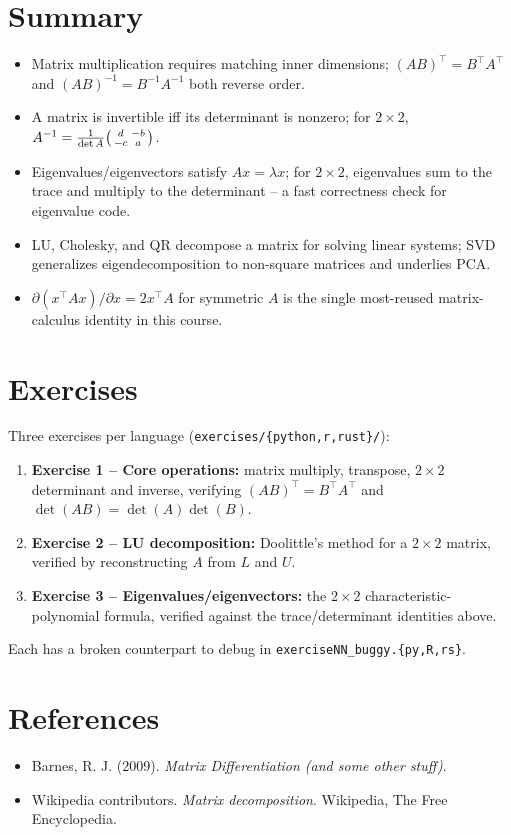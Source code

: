 \documentclass[11pt]{article}
\begin{document}
\section{Summary}
\begin{summarybox}
\begin{itemize}[nosep]
  \item Matrix multiplication requires matching inner dimensions; $(AB)^\top
        = B^\top A^\top$ and $(AB)^{-1} = B^{-1}A^{-1}$ both reverse order.
  \item A matrix is invertible iff its determinant is nonzero; for $2\times2$,
        $A^{-1} = \frac{1}{\det A}\begin{psmallmatrix}d&-b\\-c&a\end{psmallmatrix}$.
  \item Eigenvalues/eigenvectors satisfy $Ax=\lambda x$; for $2\times2$,
        eigenvalues sum to the trace and multiply to the determinant --
        a fast correctness check for eigenvalue code.
  \item LU, Cholesky, and QR decompose a matrix for solving linear systems;
        SVD generalizes eigendecomposition to non-square matrices and
        underlies PCA.
  \item $\partial(x^\top A x)/\partial x = 2x^\top A$ for symmetric $A$ is
        the single most-reused matrix-calculus identity in this course.
\end{itemize}
\end{summarybox}

\section{Exercises}
Three exercises per language (\texttt{exercises/\{python,r,rust\}/}):
\begin{enumerate}
  \item \textbf{Exercise 1 -- Core operations:} matrix multiply, transpose,
        $2\times2$ determinant and inverse, verifying $(AB)^\top=B^\top A^\top$
        and $\det(AB)=\det(A)\det(B)$.
  \item \textbf{Exercise 2 -- LU decomposition:} Doolittle's method for a
        $2\times2$ matrix, verified by reconstructing $A$ from $L$ and $U$.
  \item \textbf{Exercise 3 -- Eigenvalues/eigenvectors:} the $2\times2$
        characteristic-polynomial formula, verified against the
        trace/determinant identities above.
\end{enumerate}
Each has a broken counterpart to debug in
\texttt{exerciseNN\_buggy.\{py,R,rs\}}.

\section*{References}
\begin{itemize}[nosep]
  \item Barnes, R. J. (2009). \emph{Matrix Differentiation (and some
        other stuff)}.
  \item Wikipedia contributors. \emph{Matrix decomposition}. Wikipedia,
        The Free Encyclopedia.
\end{itemize}
\end{document}
